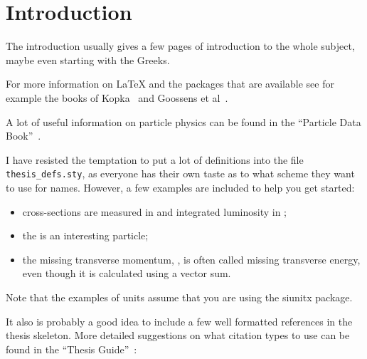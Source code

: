 
\chapter{Introduction}
\label{sec:intro}

The introduction usually gives a few pages of introduction to the
whole subject, maybe even starting with the Greeks.

For more information on \LaTeX{} and the packages that are available
see for example the books of Kopka~\citep{kopka04} and Goossens et
al~\citep{goossens04}.

A lot of useful information on particle physics can be found in the
\enquote{Particle Data Book}~\citep{pdg2010}.

I have resisted the temptation to put a lot of definitions into the
file \texttt{thesis\_defs.sty}, as everyone has their own taste as
to what scheme they want to use for names.
However, a few examples are included to help you get started:
\begin{itemize}
\setlength{\itemsep}{0pt}\setlength{\parskip}{0pt}
\item cross-sections are measured in \si{\pb} and integrated
  luminosity in \si{\invpb};
\item the \KoS is an interesting particle;
\item the missing transverse momentum, \pTmiss, is often called
  missing transverse energy, even though it is calculated using a vector sum.
\end{itemize}
Note that the examples of units assume that you are using the
\textsf{siunitx} package.

It also is probably a good idea to include a few well formatted
references in the thesis skeleton. More detailed suggestions on what
citation types to use can be found in the \enquote{Thesis Guide}~\cite{thesis-guide}:

